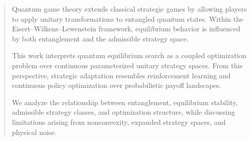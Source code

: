 \begin{abstract}
	
	Quantum game theory extends classical strategic games by allowing players to apply unitary transformations to entangled quantum states. Within the Eisert–Wilkens–Lewenstein framework, equilibrium behavior is influenced by both entanglement and the admissible strategy space.
	
	This work interprets quantum equilibrium search as a coupled optimization problem over continuous parameterized unitary strategy spaces. From this perspective, strategic adaptation resembles reinforcement learning and continuous policy optimization over probabilistic payoff landscapes.
	
	We analyze the relationship between entanglement, equilibrium stability, admissible strategy classes, and optimization structure, while discussing limitations arising from nonconvexity, expanded strategy spaces, and physical noise.
	
\end{abstract}
